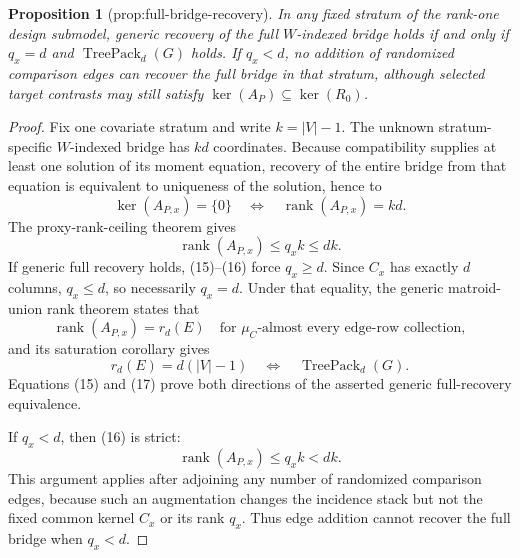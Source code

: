 \documentclass{article}
\newtheorem{proposition}{Proposition}
\begin{document}
\begin{proposition}[prop:full-bridge-recovery]\label{prop:full-bridge-recovery}
In any fixed stratum of the rank-one design submodel, generic recovery of the full \(W\)-indexed bridge holds if and only if \(q_x=d\) and \(\operatorname{TreePack}_d(G)\) holds. If \(q_x<d\), no addition of randomized comparison edges can recover the full bridge in that stratum, although selected target contrasts may still satisfy \(\ker(A_P)\subseteq\ker(R_0)\).
\end{proposition}
\begin{proof}
Fix one covariate stratum and write \(k=|V|-1\).  The unknown stratum-specific \(W\)-indexed bridge has \(kd\) coordinates.  Because compatibility supplies at least one solution of its moment equation, recovery of the entire bridge from that equation is equivalent to uniqueness of the solution, hence to
\[
\ker(A_{P,x})=\{0\}
\quad\Longleftrightarrow\quad
\operatorname{rank}(A_{P,x})=kd.
\tag{15}
\]
The proxy-rank-ceiling theorem gives
\[
\operatorname{rank}(A_{P,x})\leq q_xk\leq dk.
\tag{16}
\]
If generic full recovery holds, (15)--(16) force \(q_x\geq d\).  Since \(C_x\) has exactly \(d\) columns, \(q_x\leq d\), so necessarily \(q_x=d\).  Under that equality, the generic matroid-union rank theorem states that
\[
\operatorname{rank}(A_{P,x})=r_d(E)
\quad\text{for \(\mu_C\)-almost every edge-row collection},
\]
and its saturation corollary gives
\[
r_d(E)=d(|V|-1)
\quad\Longleftrightarrow\quad
\operatorname{TreePack}_d(G).
\tag{17}
\]
Equations (15) and (17) prove both directions of the asserted generic full-recovery equivalence.

If \(q_x<d\), then (16) is strict:
\[
\operatorname{rank}(A_{P,x})\leq q_xk<dk.
\]
This argument applies after adjoining any number of randomized comparison edges, because such an augmentation changes the incidence stack but not the fixed common kernel \(C_x\) or its rank \(q_x\).  Thus edge addition cannot recover the full bridge when \(q_x<d\).


\end{proof}
\end{document}

